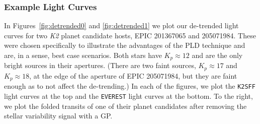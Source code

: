 \documentclass[]{emulateapj}
\begin{document}
\subsubsection{Example Light Curves}
\begin{figure*}[t]
  \begin{center}
    \leavevmode
       \caption{De-trended light curves for EPIC 201367065 \citep[K2-3,][]{CRO15}. \emph{Top}: The de-trended
                \texttt{K2SFF} flux (left) and the GP-smoothed flux folded on the period of 
                the super-Earth K2-3b (right). \emph{Bottom}: The de-trended \texttt{EVEREST}
                flux. The 6-hr CDPP is 30.9 ppm for \texttt{K2SFF} and 16.6 ppm for
                \texttt{EVEREST}, a factor of $\sim$ 2 improvement.}
     \label{fig:detrended0}
  \end{center}
\end{figure*}
\begin{figure*}[t]
  \begin{center}
    \leavevmode
       \caption{De-trended light curves for EPIC 205071984, a Campaign 2 star with three
                known planet candidates \citep{SIN15}. As in Figure~\ref{fig:detrended0}, the
                \texttt{K2SFF} light curve and the folded transit of EPIC 205071984.01
                are shown at the top; the equivalent plots for \texttt{EVEREST} are shown
                at the bottom. The 6-hr CDPP is 56.1 ppm for \texttt{K2SFF} and 24.0 ppm for
                \texttt{EVEREST}, a factor of $\gtrsim$ 2 improvement.}
     \label{fig:detrended1}
  \end{center}
\end{figure*}
In Figures~\ref{fig:detrended0} and \ref{fig:detrended1} we plot our de-trended light curves
for two \emph{K2} planet candidate hosts, EPIC 201367065 and 205071984. These were chosen
specifically to illustrate the advantages of the PLD technique and are, in a sense, best
case scenarios. Both stars have $K_p \approx 12$ and are the only bright sources in their
apertures. (There are two faint sources, $K_p \approx 17$ and $K_p \approx 18$, 
at the edge of the aperture of EPIC 205071984, but they are faint enough as to not affect
the de-trending.) In each of the figures, we plot the \texttt{K2SFF} light curves at the top
and the \texttt{EVEREST} light curves at the bottom. To the right, we plot the folded
transits of one of their planet candidates after removing the stellar variability signal with a GP.
\end{document}
